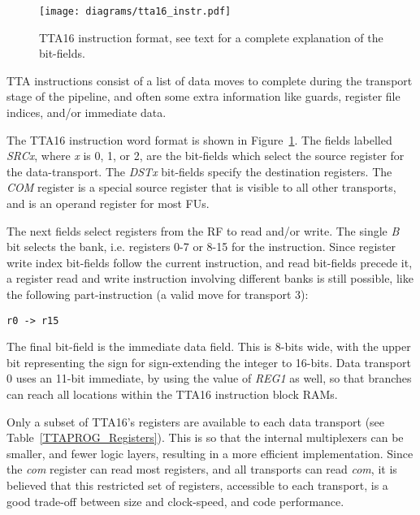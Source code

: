\begin{figure}[h!]
\begin{center}
\texttt{[image: diagrams/tta16\_instr.pdf]}
\caption[TTA16 instruction format]{TTA16 instruction format, see text for a
complete explanation of the bit-fields.}
\label{TTAPROG_Instruction_Format}
\end{center}
\end{figure}

TTA instructions consist of a list of data moves to complete during the
transport stage of the pipeline, and often some extra information like
guards\cite{corporaal1993maa}, register file indices, and/or immediate data.

The TTA16 instruction word format is shown in
Figure~\ref{TTAPROG_Instruction_Format}. The fields labelled \textit{SRCx},
where \textit{x} is 0, 1, or 2, are the bit-fields which select the
source register for the data-transport. The \textit{DSTx} bit-fields specify
the destination registers. The \textit{COM} register is a special source
register that is visible to all other transports, and is an operand register
for most FUs.

The next fields select registers from the RF to read and/or write. The single
\textit{B} bit selects the bank, i.e. registers 0-7 or 8-15 for the
instruction. Since register write index bit-fields follow the current
instruction, and read bit-fields precede it, a register read and write
instruction involving different banks is still possible, like the following
part-instruction (a valid move for transport 3):
\begin{center}
\texttt{r0	-> r15}
\end{center}

The final bit-field is the immediate data field. This is 8-bits wide, with the
upper bit representing the sign for sign-extending the integer to 16-bits. Data
transport 0 uses an 11-bit immediate, by using the value of \textit{REG1} as
well, so that branches can reach all locations within the TTA16 instruction
block RAMs.

Only a subset of TTA16's registers are available to each data transport (see
Table~\ref{TTAPROG_Registers}). This is so that the internal multiplexers can be
smaller, and fewer logic layers, resulting in a more efficient implementation.
Since the \textit{com} register can read most registers, and all transports can
read \textit{com}, it is believed that this restricted set of registers,
accessible to each transport, is a good trade-off between size and clock-speed,
and code performance.


